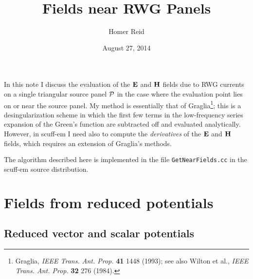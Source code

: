 \documentclass[letterpaper]{article}
\title {Fields near RWG Panels}
\author {Homer Reid}
\date {August 27, 2014}
\begin{document}
\pagestyle{myheadings}
\maketitle

In this note I discuss the evaluation of the
$\mathbf{E}$ and $\mathbf{H}$ fields due to RWG currents
on a single triangular source panel $\mathcal{P}$ in the case 
where the evaluation point lies on or near the source 
panel.
My method is essentially that of
Graglia\footnote{Graglia, \textit{IEEE Trans. Ant. Prop.} 
\textbf{41} 1448 (1993); see also 
Wilton et al., \textit{IEEE Trans. Ant. Prop.} \textbf{32} 
276 (1984).}; this is a desingularization scheme in which  
the first few terms in the low-frequency series expansion of the 
Green's function are subtracted off and evaluated analytically.
However, in {\sc scuff-em} I need also to compute the 
\textit{derivatives} of the $\mathbf{E}$ and $\mathbf{H}$ fields,
which requires an extension of Graglia's methods.

The algorithm described here is implemented in the 
file \texttt{GetNearFields.cc} in the {\sc scuff-em} source
distribution. 

\tableofcontents

\newpage
\section{Fields from reduced potentials} 

\subsection{Reduced vector and scalar potentials}
\end{document}
